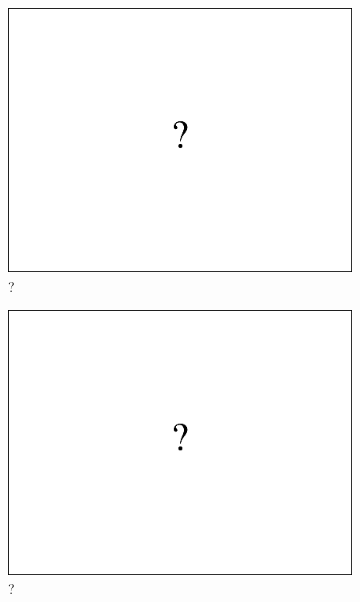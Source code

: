 \documentclass[11pt,onecolumn]{article}
\begin{document}
\begin{figure}[ht!]
\begin{subfigure}[t]{0.24\textwidth}
        \includegraphics[width=\linewidth]{fig/ap_over_time_placeholder.pdf}
        \caption{?}
    \end{subfigure}
		\begin{subfigure}[t]{0.24\textwidth}
        \centering
        \includegraphics[width=\linewidth]{fig/ap_over_time_placeholder.pdf}
        \caption{?}
    \end{subfigure}
		\begin{subfigure}[t]{0.24\textwidth}
				\centering

\end{subfigure}
\end{figure}
\end{document}
